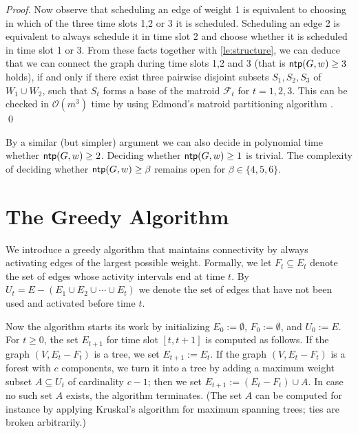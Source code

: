 \documentclass[runningheads]{llncs}
\newcommand{\bigO}{\mathcal{O}}
\DeclareMathOperator{\ntp}{\text{\sf ntp}}
\newcommand{\greedy}{\text{\sf Greedy}}
\newcommand{\lasse}[1]{#1}
\begin{document}
\begin{proof}
\lasse{Now observe that scheduling an edge of weight 1 is equivalent to choosing in which of the three time slots 1,2 or 3 it is scheduled. Scheduling an edge 2 is equivalent to always schedule it in time slot 2 and choose whether it is scheduled in time slot 1 or 3. From these facts together with \cref{le:structure}, we can deduce that we can connect the graph during time slots 1,2 and 3 (that is $\ntp(G,w)\ge3$ holds)}, if and only if there exist three pairwise disjoint subsets
$S_1,S_2,S_3$ of $W_1 \cup W_2$, such that $S_t$ forms a base of the matroid $\mathcal{F}_t$ for $t=1,2,3$.
This can be checked in $\bigO(m^3)$ time by using Edmond's matroid partitioning algorithm \cite{edmonds1965minimum}.
\qed
\end{proof}

By a similar (but simpler) argument we can also decide in polynomial time whether $\ntp(G,w)\ge2$.
Deciding whether $\ntp(G,w)\ge1$ is trivial.
The complexity of deciding whether $\ntp(G,w)\ge\beta$ remains open for $\beta\in\{4,5,6\}$.


\section{The Greedy Algorithm}
\label{sec:greedy}
We introduce a greedy algorithm that maintains connectivity by always
activating edges of the largest possible weight.
Formally, we let $F_t\subseteq E_t$ denote the set of edges whose activity intervals 
end at time $t$.
By $U_t=E-(E_1\cup E_2\cup\cdots\cup E_t)$ we denote the set of edges that have not been 
used and activated before time $t$.

Now the {\greedy} algorithm starts its work by initializing 
$E_0:=\emptyset$, $F_0:=\emptyset$, and $U_0:=E$.
For $t\ge0$, the set $E_{t+1}$ for time slot $[t,t+1]$ is computed as follows.
If the graph $(V,E_t-F_t)$ is a tree, we set $E_{t+1}:=E_t$.
If the graph $(V,E_t-F_t)$ is a forest with $c$ components, we turn it into 
a tree by adding a maximum weight subset $A\subseteq U_t$ of cardinality $c-1$;
then we set $E_{t+1}:=(E_t-F_t)\cup A$.
In case no such set $A$ exists, the {\greedy} algorithm terminates.
(The set $A$ can be computed for instance by applying Kruskal's algorithm for 
maximum spanning trees; ties are broken arbitrarily.)
\end{document}
